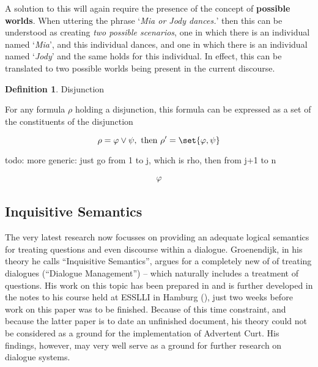 \documentclass[a4paper]{article}
\newcommand{\term}[1]{\textsf{\textbf{#1}}} %
\newcommand{\pn}{\textsf} %
\newcommand{\example}[1]{`\textit{#1}'} %
\newcommand{\acurt}{\pn{Advertent Curt}}
\theoremstyle{remark}
\theoremstyle{remark}
\theoremstyle{definition}
\newtheorem{definition}[thm]{Definition}
\theoremstyle{definition}
\begin{document}
A solution to this will again require the presence of the concept of
\term{possible worlds}. When uttering the phrase \example{Mia or Jody dances.}
then this can be understood as creating \emph{two possible scenarios}, one in
which there is an individual named \example{Mia}, and this individual dances,
and one in which there is an individual named \example{Jody} and the same holds
for this individual. In effect, this can be translated to two possible worlds
being present in the current discourse.

\begin{definition}
  Disjunction

  For any formula $\rho$ holding a disjunction, this formula can be expressed as a set
  of the constituents of the disjunction

  \[ \rho = \varphi \vee \psi, \textrm{ then } \rho' = \set{\varphi, \psi}\]


  todo: more generic: just go from 1 to j, which is rho, then from j+1 to n

  \begin{eqnarray*}
    \varphi
  \end{eqnarray*}
\end{definition}

\subsection{Inquisitive Semantics}\label{sec:altq}

The very latest research now focusses on providing an adequate logical semantics
for treating questions and even discourse within a dialogue. Groenendijk, in his
theory he calls ``Inquisitive Semantics'', argues for a completely new of of
treating dialogues (``Dialogue Management'') -- which naturally includes a
treatment of questions. His work on this topic has been prepared in \cite{g:is}
and is further developed in the notes to his course held at ESSLLI in Hamburg
(\cite{g:isdm}), just two weeks before work on this paper was to be finished.
Because of this time constraint, and because the latter paper is to date an
unfinished document, his theory could not be considered as a ground for the
implementation of \acurt. His findings, however, may very well serve as a ground
for further research on dialogue systems.
\end{document}
